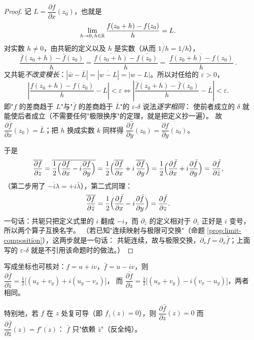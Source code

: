 \begin{proof}
记 $L=\dfrac{\partial f}{\partial x}(z_0)$，也就是
\[
\lim_{h\to 0,\,h\in\mathbb{R}}\frac{f(z_0+h)-f(z_0)}{h}=L .
\]
对实数 $h\neq0$，由共轭的定义以及 $h$ 是实数（从而 $\overline{1/h}=1/h$），
\[
\frac{\bar f(z_0+h)-\bar f(z_0)}{h}
=\frac{\overline{f(z_0+h)}-\overline{f(z_0)}}{h}
=\overline{\ \frac{f(z_0+h)-f(z_0)}{h}\ } .
\]
又共轭\emph{不改变模长}：$|\bar w-\bar L|=|\overline{w-L}|=|w-L|$。所以对任给的 $\varepsilon>0$，
\[
\left|\frac{f(z_0+h)-f(z_0)}{h}-L\right|<\varepsilon
\iff
\left|\frac{\bar f(z_0+h)-\bar f(z_0)}{h}-\bar L\right|<\varepsilon .
\]
即"$f$ 的差商趋于 $L$"与"$\bar f$ 的差商趋于 $\bar L$"的 $\varepsilon$-$\delta$ 说法\emph{逐字相同}：
使前者成立的 $\delta$ 就能使后者成立（不需要任何"极限换序"的定理，就是把定义抄一遍）。
故 $\dfrac{\partial\bar f}{\partial x}(z_0)=\bar L$；把 $h$ 换成实数 $k$ 同样得
$\dfrac{\partial\bar f}{\partial y}(z_0)=\overline{\dfrac{\partial f}{\partial y}(z_0)}$。

于是
\[
\overline{\frac{\partial f}{\partial z}}
=\overline{\frac12\Bigl(\frac{\partial f}{\partial x}-i\frac{\partial f}{\partial y}\Bigr)}
=\frac12\Bigl(\overline{\frac{\partial f}{\partial x}}+i\,\overline{\frac{\partial f}{\partial y}}\Bigr)
=\frac12\Bigl(\frac{\partial\bar f}{\partial x}+i\frac{\partial\bar f}{\partial y}\Bigr)
=\frac{\partial\bar f}{\partial\bar z},
\]
（第二步用了 $\overline{-i\lambda}=+i\bar\lambda$），第二式同理：
\[
\overline{\frac{\partial f}{\partial \bar z}}
=\frac12\Bigl(\frac{\partial\bar f}{\partial x}-i\frac{\partial\bar f}{\partial y}\Bigr)
=\frac{\partial\bar f}{\partial z}.
\]
一句话：共轭只把定义式里的 $i$ 翻成 $-i$，而 $\partial_{\bar z}$ 的定义相对于 $\partial_z$ 正好是 $i$ 变号，
所以两个算子互换名字。
（若已知"连续映射与极限可交换"（命题 \ref{prop:limit-composition}），这两步就是一句话：
共轭连续，故与极限交换，$\overline{\partial_x f}=\partial_x\bar f$；上面写的 $\varepsilon$-$\delta$ 就是不引用该命题时的做法。）
\end{proof}

\noindent
写成坐标也可核对：$f=u+iv$，$\bar f=u-iv$，则
$\dfrac{\partial\bar f}{\partial\bar z}=\frac12\bigl[(u_x+v_y)+i(u_y-v_x)\bigr]$，
而 $\overline{\dfrac{\partial f}{\partial z}}=\frac12\bigl[(u_x+v_y)-i(v_x-u_y)\bigr]$，两者相同。

\smallskip
\noindent
特别地，若 $f$ 在 $z$ 处复可导（即 $f_{\bar z}(z)=0$），则
$\dfrac{\partial\bar f}{\partial z}(z)=0$ 而 $\dfrac{\partial\bar f}{\partial\bar z}(z)=\overline{f'(z)}$：
$\bar f$ 只"依赖 $\bar z$"（反全纯）。

